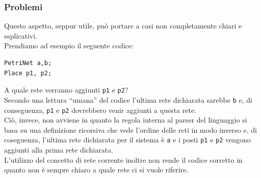 \documentclass[italian,12pt]{book}
\begin{document}
\subsubsection{Problemi}
Questo aspetto, seppur utile, può portare a casi non completamente chiari e esplicativi. \\
Prendiamo ad esempio il seguente codice:
\begin{verbatim}PetriNet a,b;
Place p1, p2;
\end{verbatim}
A quale rete verranno aggiunti {\tt p1} e {\tt p2}? \\
Secondo una lettura ``umana'' del codice l'ultima
rete dichiarata sarebbe {\tt b} e, di conseguenza, {\tt p1} e {\tt p2} dovrebbero venir aggiunti a
questa rete. \\
Ciò, invece, non avviene in quanto la regola interna al parser del linguaggio si basa su una definizione 
ricorsiva che vede l'ordine delle reti in modo inverso e, di coseguenza, l'ultima rete dichiarata per 
il sistema è {\tt a} e i posti {\tt p1} e {\tt p2} vengono aggiunti alla prima rete dichiarata.\\
L'utilizzo del concetto di rete corrente inoltre non rende il codice corretto in quanto non è sempre chiaro
a quale rete ci si vuole riferire.
\end{document}
